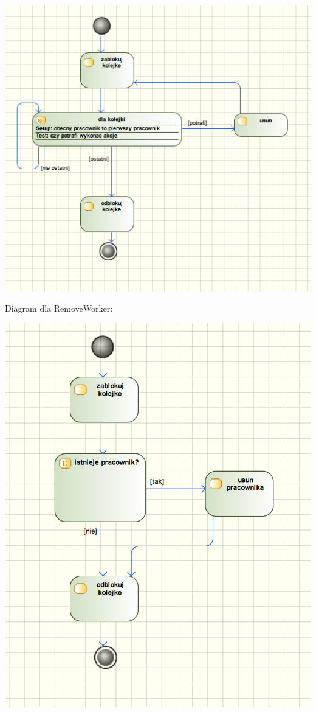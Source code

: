 \documentclass[paper=a4, fontsize=11pt]{scrartcl} %
\numberwithin{equation}{section} %
\numberwithin{figure}{section} %
\numberwithin{table}{section} %
\begin{document}
\includegraphics[width=\textwidth]{1}

Diagram dla RemoveWorker:

\includegraphics[width=\textwidth]{2}
\end{document}

